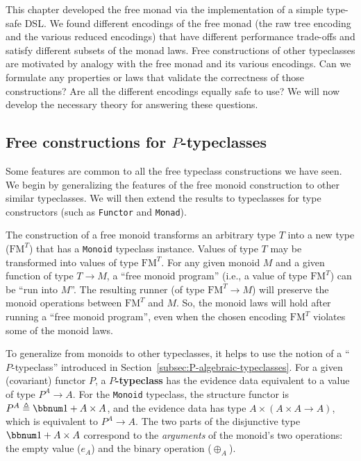 This chapter developed the free monad via the implementation of a
simple type-safe DSL. We found different encodings of the free monad
(the raw tree encoding and the various reduced encodings) that have
different performance trade-offs and satisfy different subsets of
the monad laws. Free constructions of other typeclasses are motivated
by analogy with the free monad and its various encodings. Can we formulate
any properties or laws that validate the correctness of those constructions?
Are all the different encodings equally safe to use? We will now develop
the necessary theory for answering these questions.

\subsection{Free constructions for $P$-typeclasses\label{subsec:Free-constructions-for-inductive-typeclasses}}

Some features are common to all the free typeclass constructions we
have seen. We begin by generalizing the features of the free monoid
construction to other similar typeclasses. We will then extend the
results to typeclasses for type constructors (such as \lstinline!Functor!
and \lstinline!Monad!).

The construction of a free monoid transforms an arbitrary type $T$
into a new type ($\text{FM}^{T}$) that has a \lstinline!Monoid!
typeclass instance. Values of type $T$ may be transformed into values
of type $\text{FM}^{T}$. For any given monoid $M$ and a given function
of type $T\rightarrow M$, a \textsf{``}free monoid program\textsf{''} (i.e., a value
of type $\text{FM}^{T}$) can be \textsf{``}run into $M$\textsf{''}. The resulting
runner (of type $\text{FM}^{T}\rightarrow M$) will preserve the monoid
operations between $\text{FM}^{T}$ and $M$. So, the monoid laws
will hold after running a \textsf{``}free monoid program\textsf{''}, even when the
chosen encoding $\text{FM}^{T}$ violates some of the monoid laws.

To generalize from monoids to other typeclasses, it helps to use the
notion of a \textsf{``}$P$-typeclass\textsf{''} introduced in Section~\ref{subsec:P-algebraic-typeclasses}.
For a given (covariant) functor $P$, a $P$\textbf{-typeclass} 
has the evidence data equivalent to a value of type $P^{A}\rightarrow A$.
For the \lstinline!Monoid!
typeclass, the structure functor is $P^{A}\triangleq\bbnum 1+A\times A$,
and the evidence data has type $A\times\left(A\times A\rightarrow A\right)$,
which is equivalent to $P^{A}\rightarrow A$. The two parts of the
disjunctive type $\bbnum 1+A\times A$ correspond to the \emph{arguments}
of the monoid\textsf{'}s two operations: the empty value ($e_{A}$) and the
binary operation ($\oplus_{A}$). 

